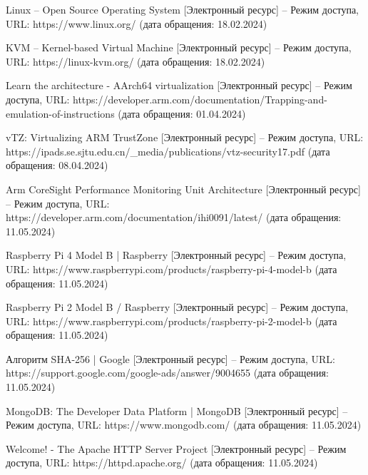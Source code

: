 \begin{thebibliography}{}
Linux -- Open Source Operating System [Электронный ресурс] – Режим доступа, URL: https://www.linux.org/ (дата обращения: 18.02.2024)

KVM -- Kernel-based Virtual Machine [Электронный ресурс] – Режим доступа, URL: https://linux-kvm.org/ (дата обращения: 18.02.2024)

Learn the architecture - AArch64 virtualization [Электронный ресурс] – Режим доступа, URL: https://developer.arm.com/documentation/Trapping-and-emulation-of-instructions (дата обращения: 01.04.2024)

vTZ: Virtualizing ARM TrustZone [Электронный ресурс] – Режим доступа, URL:
https://ipads.se.sjtu.edu.cn/\_media/publications/vtz-security17.pdf (дата обращения: 08.04.2024)

Arm CoreSight Performance Monitoring Unit Architecture [Электронный ресурс] – Режим доступа, URL:
https://developer.arm.com/documentation/ihi0091/latest/ (дата обращения: 11.05.2024)

Raspberry Pi 4 Model B | Raspberry [Электронный ресурс] – Режим доступа, URL:
https://www.raspberrypi.com/products/raspberry-pi-4-model-b (дата обращения: 11.05.2024)

Raspberry Pi 2 Model B / Raspberry [Электронный ресурс] – Режим доступа, URL:
https://www.raspberrypi.com/products/raspberry-pi-2-model-b (дата обращения: 11.05.2024)

Алгоритм SHA-256 | Google [Электронный ресурс] – Режим доступа, URL:
https://support.google.com/google-ads/answer/9004655 (дата обращения: 11.05.2024)

MongoDB: The Developer Data Platform | MongoDB  [Электронный ресурс] – Режим доступа, URL:
https://www.mongodb.com/ (дата обращения: 11.05.2024)

Welcome! - The Apache HTTP Server Project [Электронный ресурс] – Режим доступа, URL:
https://httpd.apache.org/ (дата обращения: 11.05.2024)

\end{thebibliography}
\endgroup

\pagebreak
